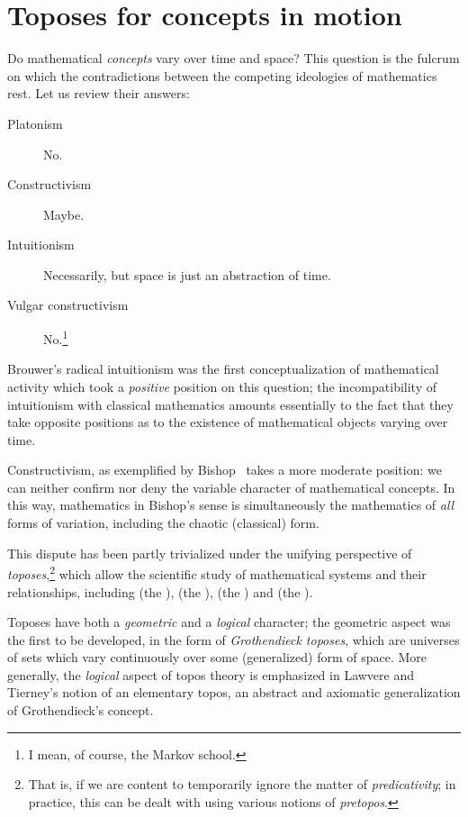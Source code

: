 \documentclass{article}
\begin{document}
\section{Toposes for concepts in motion}

Do mathematical \emph{concepts} vary over time and space? This
question is the fulcrum on which the contradictions between the
competing ideologies of mathematics rest. Let us review their answers:
\begin{description}
\item[Platonism] No.
\item[Constructivism] Maybe.
\item[Intuitionism] Necessarily, but space is just an abstraction of
  time.
\item[Vulgar constructivism] No.\footnote{I mean, of course, the Markov school.}
\end{description}

Brouwer's radical intuitionism was the first conceptualization of
mathematical activity which took a \emph{positive} position on this
question; the incompatibility of intuitionism with classical
mathematics amounts essentially to the fact that they take opposite
positions as to the existence of mathematical objects varying over
time.

Constructivism, as exemplified by Bishop~\cite{bishop:1967} takes a
more moderate position: we can neither confirm nor deny the variable
character of mathematical concepts. In this way, mathematics in
Bishop's sense is simultaneously the mathematics of \emph{all} forms
of variation, including the chaotic (classical) form.

This dispute has been partly trivialized under the unifying
perspective of \emph{toposes},\footnote{That is, if we are content to
  temporarily ignore the matter of \emph{predicativity}; in practice,
  this can be dealt with using various notions of \emph{pretopos}.}
which allow the scientific study of mathematical systems and their
relationships, including  (the ),  (the ),  (the ) and 
(the ).

Toposes have both a \emph{geometric} and a \emph{logical} character;
the geometric aspect was the first to be developed, in the form of
\emph{Grothendieck toposes}, which are universes of sets which vary
continuously over some (generalized) form of space. More generally,
the \emph{logical} aspect of topos theory is emphasized in Lawvere and
Tierney's notion of an elementary topos, an abstract and axiomatic
generalization of Grothendieck's concept.
\end{document}
